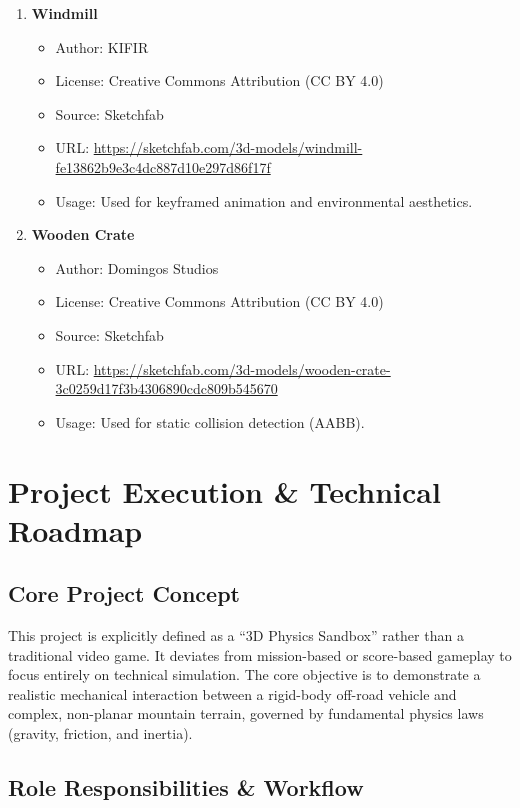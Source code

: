 \documentclass[11pt,a4paper]{article}
\begin{document}
\begin{enumerate}
  \item \textbf{Windmill}
    \begin{itemize}\setlength\itemsep{2pt}\setlength\parskip{0pt}
      \item Author: KIFIR
      \item License: Creative Commons Attribution (CC BY 4.0)
      \item Source: Sketchfab
      \item URL: \url{https://sketchfab.com/3d-models/windmill-fe13862b9e3c4dc887d10e297d86f17f}
      \item Usage: Used for keyframed animation and environmental aesthetics.
    \end{itemize}

  \item \textbf{Wooden Crate}
    \begin{itemize}\setlength\itemsep{2pt}\setlength\parskip{0pt}
      \item Author: Domingos Studios
      \item License: Creative Commons Attribution (CC BY 4.0)
      \item Source: Sketchfab
      \item URL: \url{https://sketchfab.com/3d-models/wooden-crate-3c0259d17f3b4306890cdc809b545670}
      \item Usage: Used for static collision detection (AABB).
    \end{itemize}
\end{enumerate}

\endgroup

\appendix
\section{Project Execution \& Technical Roadmap}

\subsection{Core Project Concept}

This project is explicitly defined as a ``3D Physics Sandbox'' rather than a traditional video game. It deviates from mission-based or score-based gameplay to focus entirely on technical simulation. The core objective is to demonstrate a realistic mechanical interaction between a rigid-body off-road vehicle and complex, non-planar mountain terrain, governed by fundamental physics laws (gravity, friction, and inertia).

\subsection{Role Responsibilities \& Workflow}
\end{document}
